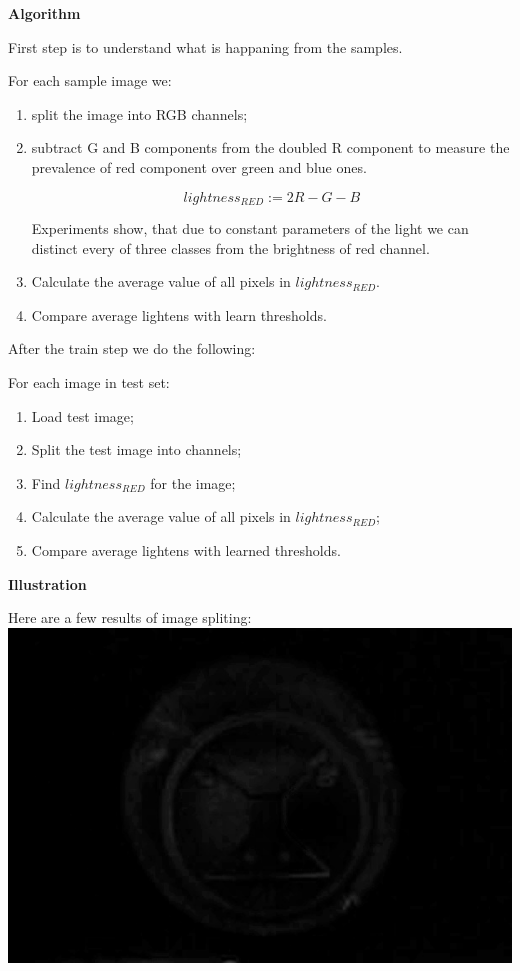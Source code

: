 \documentclass[12pt]{article}
\begin{document}
	
	\bigskip
	\textbf{Algorithm}
	
	First step is to understand what is happaning from the samples.
	
	For each sample image we:\\

	\begin{enumerate}
		\item split the image into RGB channels;
		
		\item subtract G and B components from the doubled R component to measure the prevalence of red component over green and blue ones.
		
		$$lightness_{RED}:=2R-G-B$$
		
		Experiments show, that due to constant parameters of the light we can distinct every of three classes from the brightness of red channel.
		
		\item Calculate the average value of all pixels in $lightness_{RED}$.
		\item Compare average lightens with learn thresholds.
	\end{enumerate}
	
	After the train step we do the following:
	
	For each image in test set:
	
	\begin{enumerate}
		\item Load test image;
		\item Split the test image into channels;
		\item Find $lightness_{RED}$ for the image;
		\item Calculate the average value of all pixels in $lightness_{RED}$;
		\item Compare average lightens with learned thresholds.
	\end{enumerate}
	
	\newpage
	
	\textbf{Illustration}
	
	Here are a few results of image spliting:\\
	
	\includegraphics[width=1\textwidth]{result}\\
	
\end{document}
